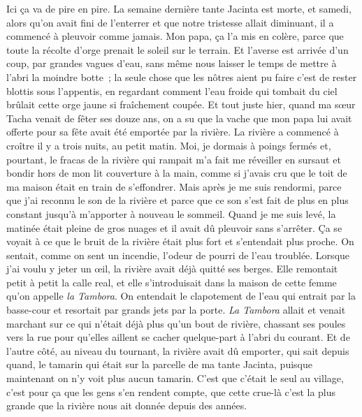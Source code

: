 	Ici ça va de pire en pire. La semaine dernière tante Jacinta est morte, et samedi, alors qu’on avait fini de l’enterrer et que notre tristesse allait diminuant, il a commencé à pleuvoir comme jamais. Mon papa, ça l’a mis en colère, parce que toute la récolte d’orge prenait le soleil sur le terrain. Et l’averse est arrivée d’un coup, par grandes vagues d’eau, sans même nous laisser le temps de mettre à l’abri la moindre botte ; la seule chose que les nôtres aient pu faire c’est de rester blottis sous l’appentis, en regardant comment l’eau froide qui tombait du ciel brûlait cette orge jaune si fraîchement coupée.
\pend
%
\pstart
	Et tout juste hier, quand ma sœur Tacha venait de fêter ses douze ans, on a su que la vache que mon papa lui avait offerte pour sa fête avait été emportée par la rivière.
\pend
%
\pstart
	La rivière a commencé à croître il y a trois nuits, au petit matin. Moi, je dormais à poings fermés et, pourtant, le fracas de la rivière qui rampait m’a fait me réveiller en sursaut et bondir hors de mon lit couverture à la main, comme si j’avais cru que le toit de ma maison était en train de s’effondrer. Mais après je me suis rendormi, parce que j’ai reconnu le son de la rivière et parce que ce son s’est fait de plus en plus constant jusqu’à m’apporter à nouveau le sommeil.
\pend
%
\pstart
	Quand je me suis levé, la matinée était pleine de gros nuages et il avait dû pleuvoir sans s’arrêter. Ça se voyait à ce que le bruit de la rivière était plus fort et s’entendait plus proche. On sentait, comme on sent un incendie, l’odeur de pourri de l’eau troublée.
\pend
%
\pstart
	Lorsque j’ai voulu y jeter un œil, la rivière avait déjà quitté ses berges. Elle remontait petit à petit la calle real, et elle s’introduisait dans la maison de cette femme qu’on appelle \textit{la Tambora}. On entendait le clapotement de l’eau qui entrait par la basse-cour et resortait par grands jets par la porte. \textit{La Tambora} allait et venait marchant sur ce qui n’était déjà plus qu’un bout de rivière, chassant ses poules vers la rue pour qu’elles aillent se cacher quelque-part à l’abri du courant.
\pend
%
\pstart
	Et de l’autre côté, au niveau du tournant, la rivière avait dû emporter, qui sait depuis quand, le tamarin qui était sur la parcelle de ma tante Jacinta, puisque maintenant on n’y voit plus aucun tamarin. C’est que c’était le seul au village, c’est pour ça que les gens s’en rendent compte, que cette crue-là c’est la plus grande que la rivière nous ait donnée depuis des années.
